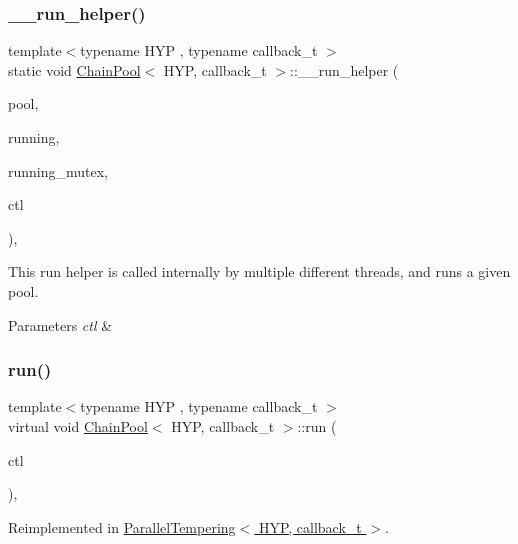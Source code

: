 \subsubsection{\texorpdfstring{\+\_\+\+\_\+run\+\_\+helper()}{\_\_run\_helper()}}
{\footnotesize\ttfamily template$<$typename H\+YP , typename callback\+\_\+t $>$ \\
static void \hyperlink{class_chain_pool}{Chain\+Pool}$<$ H\+YP, callback\+\_\+t $>$\+::\+\_\+\+\_\+run\+\_\+helper (\begin{DoxyParamCaption}\item[{std\+::vector$<$ \hyperlink{class_m_c_m_c_chain}{M\+C\+M\+C\+Chain}$<$ H\+YP, callback\+\_\+t $>$$>$ $\ast$}]{pool,  }\item[{std\+::vector$<$ bool $>$ $\ast$}]{running,  }\item[{std\+::mutex $\ast$}]{running\+\_\+mutex,  }\item[{\hyperlink{struct_control}{Control}}]{ctl }\end{DoxyParamCaption})\hspace{0.3cm}{\ttfamily [inline]}, {\ttfamily [static]}}

This run helper is called internally by multiple different threads, and runs a given pool. 
\begin{DoxyParams}{Parameters}
{\em ctl} & \\
\hline
\end{DoxyParams}
\mbox{\label{class_chain_pool_af5f0e391f9794ff89f29296c8b41bf8e}} 
\subsubsection{\texorpdfstring{run()}{run()}}
{\footnotesize\ttfamily template$<$typename H\+YP , typename callback\+\_\+t $>$ \\
virtual void \hyperlink{class_chain_pool}{Chain\+Pool}$<$ H\+YP, callback\+\_\+t $>$\+::run (\begin{DoxyParamCaption}\item[{\hyperlink{struct_control}{Control}}]{ctl }\end{DoxyParamCaption})\hspace{0.3cm}{\ttfamily [inline]}, {\ttfamily [virtual]}}



Reimplemented in \hyperlink{class_parallel_tempering_ab244166aa3c7abf2a67b9cd8ca45f844}{Parallel\+Tempering$<$ H\+Y\+P, callback\+\_\+t $>$}.



